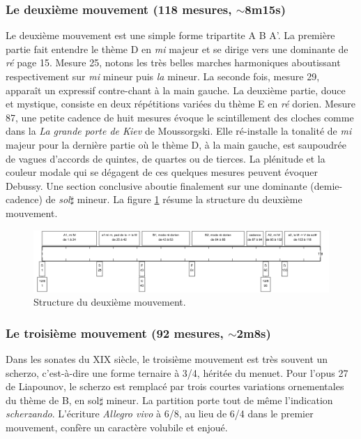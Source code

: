 \subsubsection*{Le deuxième mouvement (118 mesures, $\sim$8m15s)}

Le deuxième mouvement est une simple forme tripartite A B A'. La première partie fait entendre le thème D en \emph{mi} majeur et se dirige vers une dominante de \emph{ré} page 15. Mesure 25, notons les très belles marches harmoniques aboutissant respectivement sur \emph{mi} mineur puis \emph{la} mineur. La seconde fois, mesure 29, apparaît un expressif contre-chant à la main gauche. La deuxième partie, douce et mystique, consiste en deux répétitions variées du thème E en \emph{ré} dorien. Mesure 87, une petite cadence de huit mesures évoque le scintillement des cloches comme dans la \emph{La grande porte de Kiev} de Moussorgski. Elle ré-installe la tonalité de \emph{mi} majeur pour la dernière partie où le thème D, à la main gauche, est saupoudrée de vagues d'accords de quintes, de quartes ou de tierces. La plénitude et la couleur modale qui se dégagent de ces quelques mesures peuvent évoquer Debussy. Une section conclusive aboutie finalement sur une dominante (demie-cadence) de \emph{sol}$\sharp$ mineur. La figure \ref{schema-2} résume la structure du deuxième mouvement.

\begin{figure}[!ht]
  \begin{bigcenter}
    \includegraphics[width=17.5cm, keepaspectratio]{frise-mvt2.png}
  \end{bigcenter}
  \caption{\label{schema-2}Structure du deuxième mouvement.}
\end{figure}

\subsubsection*{Le troisième mouvement (92 mesures, $\sim$2m8s)}

Dans les sonates du XIX\ieme{} siècle, le troisième mouvement est très souvent un scherzo, c'est-à-dire une forme ternaire à 3/4, héritée du menuet. Pour l'opus 27 de Liapounov, le scherzo est remplacé par trois courtes variations ornementales du thème de B, en sol$\sharp$ mineur. La partition porte tout de même l'indication \emph{scherzando}. L'écriture \emph{Allegro vivo} à 6/8, au lieu de 6/4 dans le premier mouvement, confère un caractère volubile et enjoué.

